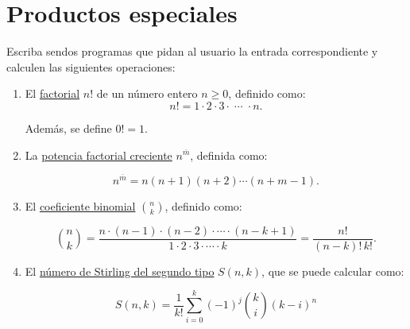 \section{Productos especiales}

Escriba sendos programas que pidan al usuario la entrada correspondiente
y calculen las siguientes operaciones:

\begin{enumerate}
\item
  El \href{http://mathworld.wolfram.com/Factorial.html}{factorial} \(n!\)
  de un número entero \(n \ge 0\), definido como:
  \[n! = 1\cdot 2\cdot 3\cdot\;\cdots\;\cdot n.\]

  Además, se define \(0! = 1\).
\item
  La \href{http://mathworld.wolfram.com/RisingFactorial.html}{potencia
  factorial creciente} \(n^{\overline{m}}\), definida como:

  \[n^{\overline{m}} = n (n + 1) (n + 2) \cdots (n + m - 1).\]
\item
  El
  \href{http://mathworld.wolfram.com/BinomialCoefficient.html}{coeficiente
  binomial} \(\binom{n}{k}\), definido como:

  \[{n\choose k} =
  \frac{n\cdot (n-1)\cdot (n-2)\cdot \cdots \cdot (n-k+1)}
  {1\cdot 2\cdot 3\cdot \cdots \cdot k} =
  \frac{n!}{(n - k)!\,k!}.\]
\item
  El
  \href{http://mathworld.wolfram.com/StirlingNumberoftheSecondKind.html}{número
  de Stirling del segundo tipo} \(S(n, k)\), que se puede calcular como:

  \[S(n, k) = \frac{1}{k!}
  \sum_{i=0}^{k} (-1)^j {k\choose i} (k - i)^n\]
\end{enumerate}
